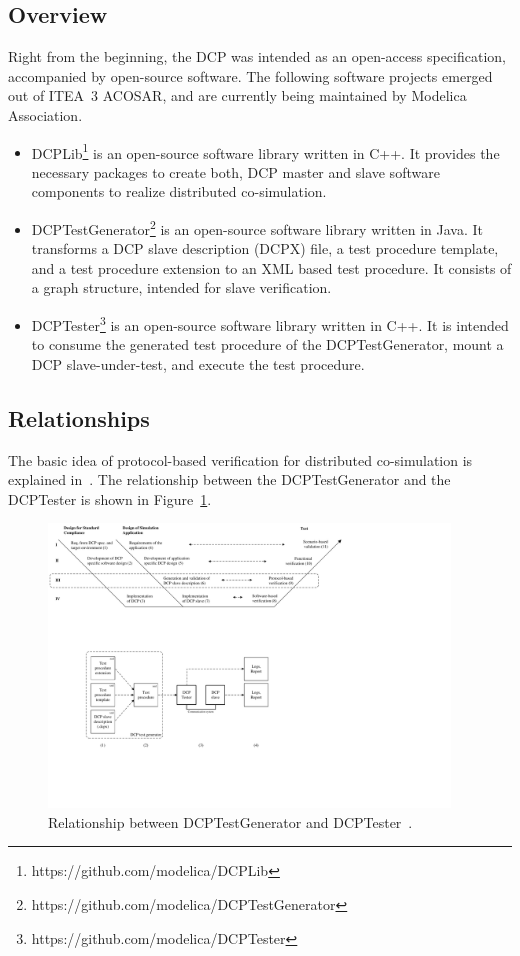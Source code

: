 \documentclass[a4paper]{scrartcl}
\theoremstyle{definition}
\begin{document}
\subsection{Overview}
Right from the beginning, the DCP was intended as an open-access specification, accompanied by open-source software.
The following software projects emerged out of ITEA~3 ACOSAR, and are currently being maintained by Modelica Association.

\begin{itemize}
	\item DCPLib\footnote{https://github.com/modelica/DCPLib} is an open-source software library written in C++.
It provides the necessary packages to create both, DCP master and slave software components to realize distributed co-simulation.
\item DCPTestGenerator\footnote{https://github.com/modelica/DCPTestGenerator} is an open-source software library written in Java.
It transforms a DCP slave description (DCPX) file, a test procedure template, and a test procedure extension to an XML based test procedure. 
It consists of a graph structure, intended for slave verification.
\item DCPTester\footnote{https://github.com/modelica/DCPTester} is an open-source software library written in C++.
It is intended to consume the generated test procedure of the DCPTestGenerator, mount a DCP slave-under-test, and execute the test procedure.
\end{itemize}

\subsection{Relationships}

The basic idea of protocol-based verification for distributed co-simulation is explained in~\cite{Krammer2020}.
The relationship between the DCPTestGenerator and the DCPTester is shown in Figure~\ref{fig:relationships}.

\begin{figure}[H]
	\centering
		\includegraphics[width=0.95\textwidth, clip=true,trim=3.5cm 6cm 19cm 13cm]{resources/overall_process.pdf}
	\caption{Relationship between DCPTestGenerator and DCPTester~\cite{Krammer2020}.}
	\label{fig:relationships}
\end{figure}
\end{document}
